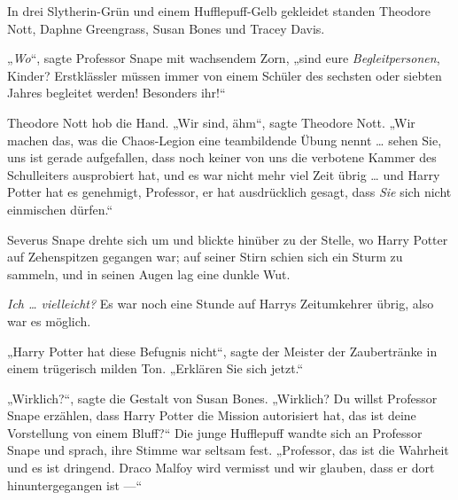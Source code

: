 In drei Slytherin-Grün und einem Hufflepuff-Gelb gekleidet standen Theodore Nott, Daphne Greengrass, Susan Bones und Tracey Davis.

„\emph{Wo}“, sagte Professor Snape mit wachsendem Zorn, „sind eure \emph{Begleitpersonen}, Kinder? Erstklässler müssen immer von einem Schüler des sechsten oder siebten Jahres begleitet werden! Besonders ihr!“

Theodore Nott hob die Hand.
„Wir sind, ähm“, sagte Theodore Nott.
„Wir machen das, was die Chaos-Legion eine teambildende Übung nennt … sehen Sie, uns ist gerade aufgefallen, dass noch keiner von uns die verbotene Kammer des Schulleiters ausprobiert hat, und es war nicht mehr viel Zeit übrig … und Harry Potter hat es genehmigt, Professor, er hat ausdrücklich gesagt, dass \emph{Sie} sich nicht einmischen dürfen.“

Severus Snape drehte sich um und blickte hinüber zu der Stelle, wo Harry Potter auf Zehenspitzen gegangen war; auf seiner Stirn schien sich ein Sturm zu sammeln, und in seinen Augen lag eine dunkle Wut.

\emph{Ich … vielleicht?}
Es war noch eine Stunde auf Harrys Zeitumkehrer übrig, also war es möglich.

„Harry Potter hat diese Befugnis nicht“, sagte der Meister der Zaubertränke in einem trügerisch milden Ton.
„Erklären Sie sich jetzt.“

„Wirklich?“, sagte die Gestalt von Susan Bones.
„Wirklich? Du willst Professor Snape erzählen, dass Harry Potter die Mission autorisiert hat, das ist deine Vorstellung von einem Bluff?“ Die junge Hufflepuff wandte sich an Professor Snape und sprach, ihre Stimme war seltsam fest.
„Professor, das ist die Wahrheit und es ist dringend. Draco Malfoy wird vermisst und wir glauben, dass er dort hinuntergegangen ist —“

